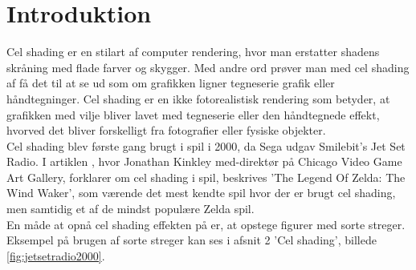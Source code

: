 \newpage
\section{Introduktion}
\setcounter{page}{1}
Cel shading er en stilart af computer rendering, hvor man erstatter shadens skråning med flade farver og skygger. Med andre ord prøver man med cel shading af få det til at se ud som om grafikken ligner tegneserie grafik eller håndtegninger. Cel shading er en ikke fotorealistisk rendering som betyder, at grafikken med vilje bliver lavet med tegneserie eller den håndtegnede effekt, hvorved det bliver forskelligt fra fotografier eller fysiske objekter. \\
Cel shading blev første gang brugt i spil i 2000, da Sega udgav  Smilebit's Jet Set Radio\cite{tvtropes}. I artiklen \cite{kinkley2016}, hvor Jonathan Kinkley med-direktør på Chicago Video Game Art Gallery, forklarer om cel shading i spil, beskrives ’The Legend Of Zelda: The Wind Waker', som værende det mest kendte spil hvor der er brugt cel shading, men samtidig et af de mindst populære Zelda spil.
\\
En måde at opnå cel shading effekten på er, at opstege figurer med sorte streger. Eksempel på brugen af sorte streger kan ses i afsnit 2 'Cel shading', billede \ref{fig:jetsetradio2000}.